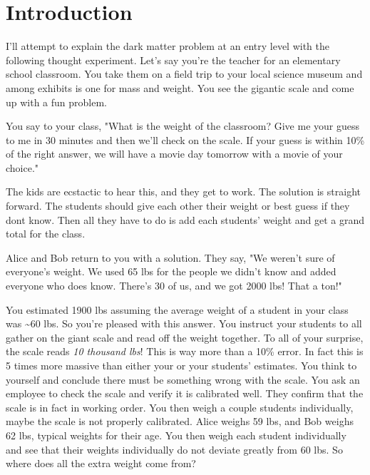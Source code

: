 \section{Introduction\label{sec:intro2dm}}

I'll attempt to explain the dark matter problem at an entry level with the following thought experiment.
Let's say you're the teacher for an elementary school classroom.
You take them on a field trip to your local science museum and among exhibits is one for mass and weight.
You see the gigantic scale and come up with a fun problem.

You say to your class, "What is the weight of the classroom?
Give me your guess to me in 30 minutes and then we'll check on the scale.
If your guess is within 10\% of the right answer, we will have a movie day tomorrow with a movie of your choice."

The kids are ecstactic to hear this, and they get to work.
The solution is straight forward.
The students should give each other their weight or best guess if they dont know.
Then all they have to do is add each students' weight and get a grand total for the class.

Alice and Bob return to you with a solution. They say, "We weren't sure of everyone's weight.
We used 65 lbs for the people we didn't know and added everyone who does know.
There's 30 of us, and we got 2000 lbs!
That a ton!"

You estimated 1900 lbs assuming the average weight of a student in your class was \textasciitilde 60 lbs.
So you're pleased with this answer.
You instruct your students to all gather on the giant scale and read off the weight together.
To all of your surprise, the scale reads \textit{10 thousand lbs}!
This is way more than a 10\% error.
In fact this is 5 times more massive than either your or your students' estimates.
You think to yourself and conclude there must be something wrong with the scale.
You ask an employee to check the scale and verify it is calibrated well.
They confirm that the scale is in fact in working order.
You then weigh a couple students individually, maybe the scale is not properly calibrated.
Alice weighs 59 lbs, and Bob weighs 62 lbs, typical weights for their age.
You then weigh each student individually and see that their weights individually do not deviate greatly from 60 lbs.
So where does all the extra weight come from?


